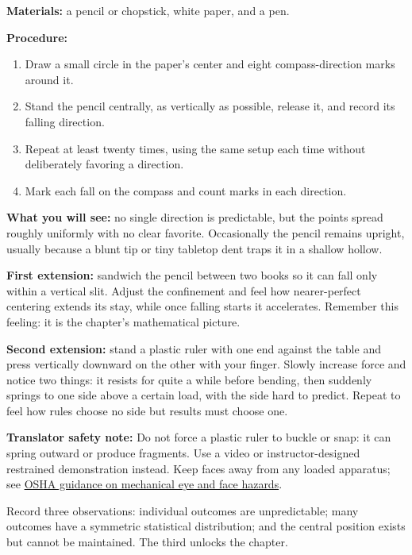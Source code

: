 \begin{experiment}
\textbf{Materials:} a pencil or chopstick, white paper, and a pen.

\textbf{Procedure:}
\begin{enumerate}[leftmargin=2em]
  \item Draw a small circle in the paper's center and eight compass-direction marks around it.
  \item Stand the pencil centrally, as vertically as possible, release it, and record its falling direction.
  \item Repeat at least twenty times, using the same setup each time without deliberately favoring a direction.
  \item Mark each fall on the compass and count marks in each direction.
\end{enumerate}

\textbf{What you will see:} no single direction is predictable, but the points spread roughly uniformly with no clear favorite. Occasionally the pencil remains upright, usually because a blunt tip or tiny tabletop dent traps it in a shallow hollow.

\textbf{First extension:} sandwich the pencil between two books so it can fall only within a vertical slit. Adjust the confinement and feel how nearer-perfect centering extends its stay, while once falling starts it accelerates. Remember this feeling: it is the chapter's mathematical picture.

\textbf{Second extension:} stand a plastic ruler with one end against the table and press vertically downward on the other with your finger. Slowly increase force and notice two things: it resists for quite a while before bending, then suddenly springs to one side above a certain load, with the side hard to predict. Repeat to feel how rules choose no side but results must choose one.

\textbf{Translator safety note:} Do not force a plastic ruler to buckle or snap: it can spring outward or produce fragments. Use a video or instructor-designed restrained demonstration instead. Keep faces away from any loaded apparatus; see \href{https://www.osha.gov/eye-face-protection}{OSHA guidance on mechanical eye and face hazards}.
\end{experiment}

\begin{mainline}
Record three observations: individual outcomes are unpredictable; many outcomes have a symmetric statistical distribution; and the central position exists but cannot be maintained. The third unlocks the chapter.
\end{mainline}

